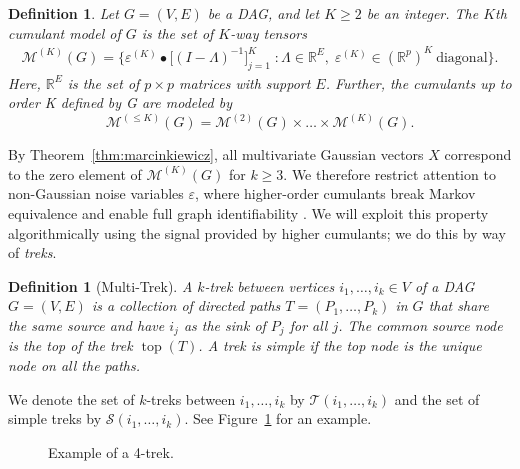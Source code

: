 \documentclass[11pt,a4paper]{article}
\numberwithin{equation}{section}
\newtheorem{definition}[theorem]{Definition}
\DeclareMathOperator{\ttop}{top}
\begin{document}
\begin{definition}
Let $G=(V,E)$ be a DAG, and let $K\geq2$ be an integer.  The $K$th cumulant model of $G$ is the set of $K$-way tensors 
\begin{multline*}
    \mathcal{M}^{(K)}(G)=
    \{\varepsilon^{(K)}\bullet \big[(I-\Lambda)^{-1} \big]_{j=1}^K\;:
    \Lambda\in\mathbb{R}^E,\; \varepsilon^{(K)}\in(\mathbb{R}^{p})^K \ \text{diagonal}\}.
\end{multline*}
Here, $\mathbb{R}^E$ is the set of $p\times p$ matrices with support $E$.
Further, the cumulants up to order K defined by G are modeled by 
\begin{equation}
    \mathcal{M}^{(\leq K)}(G)=\mathcal{M}^{(2)}(G)\times\dots\times\mathcal{M}^{(K)}(G).
\end{equation}
\end{definition}

By Theorem~\ref{thm:marcinkiewicz}, all multivariate Gaussian vectors $X$ correspond to the zero element of $\mathcal{M}^{(K)}(G)$ for $k\geq3$. We therefore restrict attention to non-Gaussian noise variables $\varepsilon$, where higher-order cumulants break Markov equivalence and enable full graph identifiability \citep{shimizu:hoyer:2006,shimizu:2011}. We will exploit this property algorithmically using the signal provided by higher cumulants; we do this by way of {\em treks}.

\begin{definition}[Multi-Trek]
A $k$-trek between vertices $i_1,\dots,i_k\in V$ of a DAG $G=(V,E)$ is a collection of directed paths $T=(P_1,\dots,P_k)$ in $G$ that share the same source and have $i_j$ as the sink of $P_j$ for all $j$. The common source node is the top of the trek $\ttop(T)$.  A trek is simple if the top node is the unique node on all the paths. 
\end{definition}

We denote the set of $k$-treks between $i_1,\dots,i_k$ by $\mathcal{T}(i_1,\dots,i_k)$ and the set of simple treks by $\mathcal{S}(i_1,\dots,i_k)$. See Figure~\ref{fig:trek} for an example.
\begin{figure}[ht]
\centering
{}
\caption{Example of a 4-trek.}
\label{fig:trek}
\end{figure}
\end{document}
